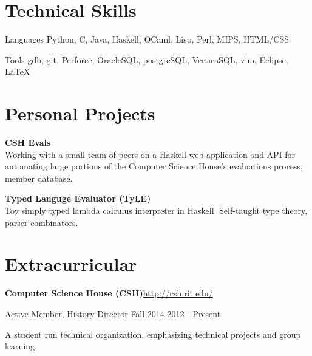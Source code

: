 \documentclass[letter,margin,line]{resume}
\newcommand{\rurl}[1]{\hfill {\footnotesize \url{#1}}}
\begin{document}
\begin{resume}
        \section{\mysidestyle Technical Skills}
        \begin{compactdesc}
        \item[Languages] { \small
                 Python,
                 C,
                 Java,
                 Haskell,
                 OCaml,
                 Lisp,
                 Perl,
                 MIPS,
                 HTML/CSS
            }
        \item[Tools] { \small
                gdb,
                git,
                Perforce,
                OracleSQL,
                postgreSQL,
                VerticaSQL,
                vim,
                Eclipse,
                \LaTeX
            }
        \end{compactdesc}
        \section{\mysidestyle Personal Projects}
        \begin{asparablank}
        \item {\bf CSH Evals}\\
            {\small Working with a small team of peers on a Haskell web application and API for automating large portions of
            the Computer Science House's evaluations process, member database.}
            \\
        \item {\bf Typed Languge Evaluator (TyLE)}\\
            {\small
                Toy simply typed lambda calculus interpreter in Haskell. Self-taught type theory, parser combinators.
            }
            \\
        \end{asparablank}
        \section{\mysidestyle Extracurricular}
        \begin{asparablank}
        \item {\bf Computer Science House ({\small CSH})}\rurl{http://csh.rit.edu/}
        \small	\item Active Member, History Director Fall 2014 \hfill 2012 - Present
        \item A student run technical organization, emphasizing technical projects and group learning.
            \\
        \end{asparablank}
    \end{resume}
    
\end{document}

